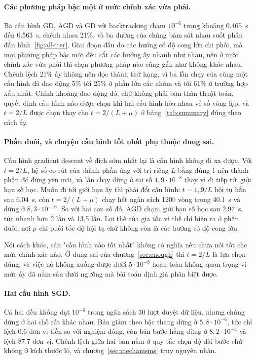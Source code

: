 \paragraph{Các phương pháp bậc một ở mức chính xác vừa phải.} Ba cấu hình GD, AGD
và GD với backtracking chạm $10^{-6}$ trong khoảng \SI{0.465}{\second} đến
\SI{0.563}{\second}, chênh nhau 21\%, và ba đường của chúng bám sát nhau suốt
phần đầu hình~\ref{fig:all-iter}. Giai đoạn đầu do các hướng có độ cong lớn chi
phối, mà mọi phương pháp bậc một đều cắt các hướng ấy nhanh như nhau, nên ở mức
chính xác vừa phải thì chọn phương pháp nào cũng gần như không khác nhau. Chênh
lệch 21\% ấy không nên đọc thành thứ hạng, vì ba lần chạy của cùng một cấu hình
đã dao động 5\% tới 25\% ở phần lớn các nhóm và tới 61\% ở trường hợp xấu nhất.
Chính khoảng dao động đó, chứ không phải bản thân thuật toán, quyết định cấu hình
nào được chọn khi hai cấu hình hòa nhau về số vòng lặp, và $t = 2/L$ được chọn thay
cho $t = 2/(L+\mu)$ ở bảng~\ref{tab:summary} đúng theo cách ấy.

\paragraph{Phần đuôi, và chuyện cấu hình tốt nhất phụ thuộc dung sai.} Cấu hình
gradient descent về đích sớm nhất lại là cấu hình không đi xa được. Với
$t = 2/L$, hệ số co rút của thành phần ứng với trị riêng $L$ bằng đúng 1 nên
thành phần đó đứng yên mãi, và lần chạy dừng ở sai số $4{,}9 \cdot 10^{-8}$ thay
vì đi tiếp tới giới hạn số học. Muốn đi tới giới hạn ấy thì phải đổi cấu hình:
$t = 1{,}9/L$ hội tụ hẳn sau \SI{6.04}{\second}, còn $t = 2/(L+\mu)$ chạy hết
ngân sách 1200 vòng trong \SI{40.1}{\second} và dừng ở $8{,}3 \cdot 10^{-16}$. So
với hai con số đó, AGD chạm giới hạn số học sau \SI{2.97}{\second}, tức nhanh hơn
2 lần và 13,5 lần. Lợi thế của gia tốc vì thế chỉ hiện ra ở phần đuôi, nơi $\mu$
chi phối tốc độ hội tụ chứ không còn là các hướng có độ cong lớn.

Nói cách khác, câu "cấu hình nào tốt nhất" không có nghĩa nếu chưa nói tốt cho
mức chính xác nào. Ở dung sai của chương~\ref{sec:enough} thì $t = 2/L$ là lựa
chọn đúng, và việc nó không xuống được dưới $5 \cdot 10^{-8}$ hoàn toàn không
quan trọng vì mức ấy đã nằm sâu dưới ngưỡng mà bài toán định giá phân biệt được.

\paragraph{Hai cấu hình SGD.} Cả hai đều không đạt $10^{-6}$ trong ngân sách 30
lượt duyệt dữ liệu, nhưng chúng dừng ở hai chỗ rất khác nhau. Bản giảm theo bậc
thang dừng ở $5{,}8 \cdot 10^{-6}$, tức chỉ lệch \num{0.6} đơn vị tiền so với
nghiệm đóng, còn bản bước hằng dừng ở $8{,}2 \cdot 10^{-4}$ và lệch \num{87.7}
đơn vị. Chênh lệch giữa hai bản nằm ở quy tắc chọn độ dài bước chứ không ở kích
thước lô, và chương~\ref{sec:mechanisms} truy nguyên nhân.

